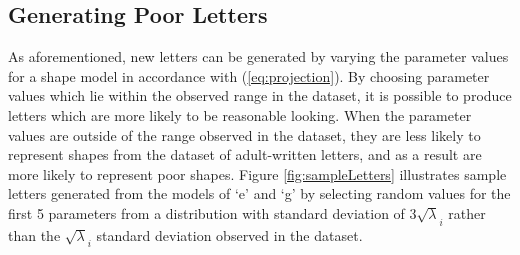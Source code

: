 \documentclass{sig-alternate}
\begin{document}
\subsection{Generating Poor Letters}

As aforementioned, new letters can be generated by varying the parameter values 
for a shape model in accordance with (\ref{eq:projection}). By choosing
parameter values which lie within the observed range in the dataset, it is
possible to produce letters which are more likely to be reasonable looking.
When the parameter values are outside of the range observed in the dataset, they
are less likely to represent shapes from the dataset of adult-written letters, 
and as a result are more likely to represent poor shapes.
Figure \ref{fig:sampleLetters} illustrates sample letters generated from the
models of `e' and `g' by selecting random values for the first 5 parameters 
from a distribution with
standard deviation of $3\sqrt\lambda_i$ rather than the $\sqrt\lambda_i$
standard deviation observed in the dataset.
\end{document}
